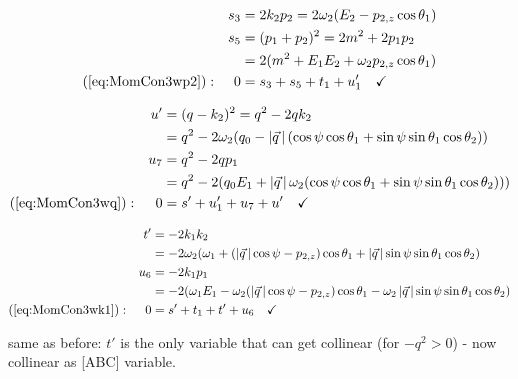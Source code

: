 \begin{align}
&&s_3 &= 2k_2p_2 = 2\omega_2(E_2-p_{2,z}\cos\theta_1)\\
&&s_5 &= (p_1+p_2)^2 = 2m^2+2p_1p_2\\
&& &= 2(m^2+E_1E_2+\omega_2p_{2,z}\cos\theta_1)\\
(\ref{eq:MomCon3wp2}): &&0 &= s_3+s_5+t_1+u_1'\quad\checkmark
\end{align}

\begin{align}
&&u' &=(q-k_2)^2 = q^2-2qk_2 \\
 &&&= q^2-2\omega_2(q_0 -\left|\vec q\,\right|(\cos\psi\cos\theta_1 + \sin\psi\sin\theta_1\cos\theta_2))\\
&&u_7 &= q^2-2qp_1\\
 &&&=q^2 - 2(q_0E_1 +\left|\vec q\,\right|\omega_2(\cos\psi\cos\theta_1 + \sin\psi\sin\theta_1\cos\theta_2)))\\
(\ref{eq:MomCon3wq}): &&0 &=s'+u_1'+u_7+u'\quad\checkmark
\end{align}

\begin{align}
&&t' &= -2k_1k_2\\
 &&&= -2\omega_2(\omega_1 + (\left|\vec q\,\right|\cos\psi-p_{2,z})\cos\theta_1 + \left|\vec q\,\right|\sin\psi\sin\theta_1\cos\theta_2)\\
&&u_6 &= - 2k_1p_1\\
 &&&= -2(\omega_1 E_1 - \omega_2(\left|\vec q\,\right|\cos\psi-p_{2,z})\cos\theta_1 - \omega_2\left|\vec q\,\right|\sin\psi\sin\theta_1\cos\theta_2)\\
(\ref{eq:MomCon3wk1}): &&0 &= s'+t_1+t'+u_6\quad\checkmark
\end{align}

same as before: $t'$ is the only variable that can get collinear (for $-q^2 > 0$) - now collinear as [ABC] variable.

